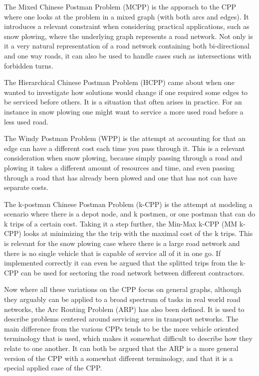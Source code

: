 The Mixed Chinese Postman Problem (MCPP) is the apporach to the CPP where one looks at the problem in a mixed graph (with both arcs and edges). It introduces a relevant constraint when considering practical applications, such as snow plowing, where the underlying graph represents a road network. Not only is it a very natural representation of a road network containing both bi-directional and one way roads, it can also be used to handle cases such as intersections with forbidden turns. 

The Hierarchical Chinese Postman Problem (HCPP) came about when one wanted to investigate how solutions would change if one required some edges to be serviced before others. It is a situation that often arises in practice. For an instance in snow plowing one might want to service a more used road before a less used road.

The Windy Postman Problem (WPP) is the attempt at accounting for that an edge can have a different cost each time you pass through it. This is a relevant consideration when snow plowing, because simply passing through a road and plowing it takes a different amount of resources and time, and even passing through a road that has already been plowed and one that has not can have separate costs.

The k-postman Chinese Postman Problem (k-CPP) is the attempt at modeling a scenario where there is a depot node, and k postmen, or one postman that can do k trips of a certain cost. Taking it a step further, the Min-Max k-CPP (MM k-CPP) looks at minimizing the the trip with the maximal cost of the k trips. This is relevant for the snow plowing case where there is a large road network and there is no single vehicle that is capable of service all of it in one go. If implemented correctly it can even be argued that the splitted trips from the k-CPP can be used for sectoring the road network between different contractors.

Now where all these variations on the CPP focus on general graphs, although they arguably can be applied to a broad spectrum of tasks in real world road networks, the Arc Routing Problem (ARP) has also been defined. It is used to describe problems centered around servicing arcs in transport networks. The main difference from the various CPPs tends to be the more vehicle oriented terminology that is used, which makes it somewhat difficult to describe how they relate to one another. It can both be argued that the ARP is a more general version of the CPP with a somewhat different terminology, and that it is a special applied case of the CPP.

